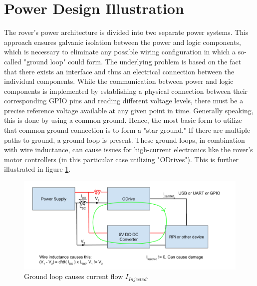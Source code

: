     \clearpage %
    
\section{Power Design Illustration}

    The rover's power architecture is divided into two separate power systems. This approach ensures galvanic isolation between the power and logic components, which is necessary to eliminate any possible wiring configuration in which a so-called "ground loop" could form. The underlying problem is based on the fact that there exists an interface and thus an electrical connection between the individual components. While the communication between power and logic components is implemented by establishing a physical connection between their corresponding GPIO pins and reading different voltage levels, there must be a precise reference voltage available at any given point in time. Generally speaking, this is done by using a common ground. Hence, the most basic form to utilize that common ground connection is to form a "star ground." If there are multiple paths to ground, a ground loop is present. These ground loops, in combination with wire inductance, can cause issues for high-current electronics like the rover's motor controllers (in this particular case utilizing "ODrives"). This is further illustrated in figure \ref{ground_loop_bad}.
    
    \begin{figure}[h] %
        \includegraphics[width=\textwidth]{contents/figures/ground_loop_bad.png}
        \caption{Ground loop causes current flow $I_{Injected}$.}
        \label{ground_loop_bad}
    \end{figure}
    
